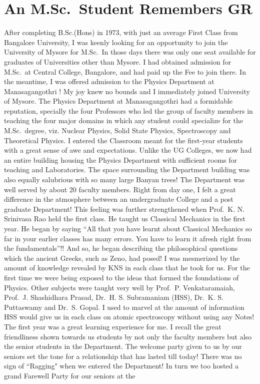 \chapter{An M.Sc.\ Student Remembers GR}\label{chap18}




After completing B.Sc.(Hons) in 1973, with just an average First Class from Bangalore University, I was keenly looking for an opportunity to join the University of Mysore for M.Sc.\ In those days there was only one seat available for graduates of Universities other than Mysore. I had obtained admission for M.Sc.\ at Central College, Bangalore, and had paid up the Fee to join there. In the meantime, I was offered admission to the Physics Department at Manasagangothri ! My joy knew no bounds and I immediately joined University of Mysore. The Physics Department at Manasagangothri had a formidable reputation, specially the four Professors who led the group of faculty members in teaching the four major domains in which any student could specialize for the M.Sc.\  degree, viz. Nuclear Physics, Solid State Physics, Spectroscopy and Theoretical Physics. I entered the Classroom meant for the first-year students with a great sense of awe and expectations. Unlike the UG Colleges, we now had an entire building housing the Physics Department with sufficient rooms for teaching and Laboratories. The space surrounding the Department building was also equally salubrious with so many large Banyan trees! The Department was well served by about 20 faculty members. Right from day one, I felt a great difference in the atmosphere between an undergraduate College and a post graduate Department! This feeling was further strengthened when Prof.\ K. N. Srinivasa Rao held the first class. He taught us Classical Mechanics in the first year. He began by saying  ``All that you have learnt about Classical Mechanics so far in your earlier classes has many errors. You have to learn it afresh right from the fundamentals”!! And so, he began describing the philosophical questions which the ancient Greeks, such as Zeno, had posed! I was mesmerized by the amount of knowledge revealed by KNS in each class that he took for us. For the first time we were being exposed to the ideas that formed the foundations of Physics. Other subjects were taught very well by Prof.\ P. Venkataramaiah, Prof.\ J. Shashidhara Prasad, Dr.\ H. S. Subramaniam (HSS), Dr.\ K. S. Puttaswamy and Dr.\ S. Gopal. I used to marvel at the amount of information HSS would give us in each class on atomic spectroscopy without using any Notes! The first year was a great learning experience for me. I recall the great friendliness shown towards us students by not only the faculty members but also the senior students in the Department. The welcome party given to us by our seniors set the tone for a relationship that has lasted till today! There was no sign of ``Ragging" when we entered the Department! In turn we too hosted a grand Farewell Party for our seniors at the 